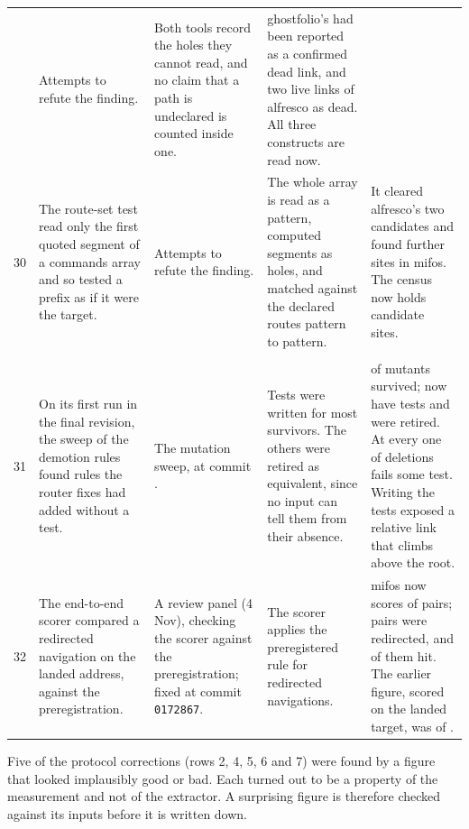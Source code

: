 \begin{xltabular}{\textwidth}{@{}rYYYY@{}}
  & Attempts to refute the finding.
  & Both tools record the holes they cannot read, and no claim that a path is undeclared is counted inside one.
  & ghostfolio's  had been reported as a confirmed dead link, and two live links of alfresco as dead. All three constructs are read now. \\
30 & The route-set test read only the first quoted segment of a commands array and so tested a prefix as if it were the target.
  & Attempts to refute the finding.
  & The whole array is read as a pattern, computed segments as holes, and matched against the declared routes pattern to pattern.
  & It cleared alfresco's two candidates and found further sites in mifos. The census now holds \RoundTwoDeadLinkCandidates{} candidate sites. \\
\addlinespace
{} \\
31 & On its first run in the final revision, the sweep of the demotion rules found rules the router fixes had added without a test.
  & The mutation sweep, at commit \SweepEarlierCommit{}.
  & Tests were written for most survivors. The others were retired as equivalent, since no input can tell them from their absence.
  & \SweepEarlierSurvived{} of \SweepEarlierMutants{} mutants survived; \SweepEarlierCovered{} now have tests and \SweepEarlierRetired{} were retired. At \SweepCommit{} every one of \SweepMutants{} deletions fails some test. Writing the tests exposed a relative link that climbs above the root. \\
32 & The end-to-end scorer compared a redirected navigation on the landed address, against the preregistration.
  & A review panel (4 Nov), checking the scorer against the preregistration; fixed at commit \texttt{0172867}.
  & The scorer applies the preregistered rule for redirected navigations.
  & mifos now scores \EtoEMifosHit{} of \EtoEMifosPairs{} pairs; \EtoEMifosRedirect{} pairs were redirected, and \EtoEMifosHitRedirect{} of them hit. The earlier figure, scored on the landed target, was \EtoEMifosHitAfterRedirects{} of \EtoEMifosPairsAfterRedirects{}. \\
\end{xltabular}
\endgroup

Five of the protocol corrections (rows 2, 4, 5, 6 and 7) were found by a figure that looked implausibly good or bad. Each turned out to be a property of the measurement and not of the extractor. A surprising figure is therefore checked against its inputs before it is written down.

